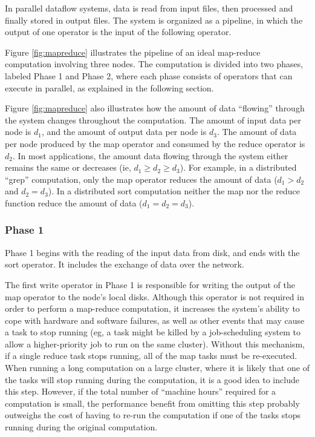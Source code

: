 \documentclass[ 11pt, letterpaper]{article}%
\begin{document}
In parallel dataflow systems, data is read from input files, then processed and
finally stored in output files. The system is organized as a pipeline, in which
the output of one operator is the input of the following operator.

\begin{figure*}
\begin{center}
\caption{A map-reduce dataflow.}
\label{fig:mapreduce}
\end{center}
\end{figure*}

Figure \ref{fig:mapreduce} illustrates the pipeline of an ideal map-reduce
computation involving three nodes. The computation is divided into two phases,
labeled Phase 1 and Phase 2, where each phase consists of operators that can
execute in parallel, as explained in the following section.

Figure \ref{fig:mapreduce} also illustrates how the amount of data ``flowing''
through the system changes throughout the computation. The amount of input data
per node is $d_1$, and the amount of output data per node is $d_3$. The amount
of data per node produced by the map operator and consumed by the reduce
operator is $d_2$. In most applications, the amount data flowing through the
system either remains the same or decreases (ie, $d_1 \ge d_2 \ge d_3$). For
example, in a distributed ``grep'' computation, only the map operator reduces
the amount of data ($d_1 > d_2$ and $d_2 =
d_3$). In a distributed sort computation neither the map nor the reduce
function reduce the amount of data ($d_1 = d_2 = d_3$).

\subsubsection{Phase 1}

Phase 1 begins with the reading of the input data from disk, and ends with the
sort operator. It includes the exchange of data over the network.

The first
write operator in Phase 1 is responsible for writing the output of the map
operator to the node's local disks. Although this operator is not required
in order to perform a map-reduce computation, it increases the system's ability to cope with hardware and software failures, as well as other events that may cause a task to stop running (eg, a task might be killed by a
job-scheduling system to allow a higher-priority job to run on the same
cluster). Without this mechanism, if a single reduce task stops running, all of the map tasks must be re-executed. When running a long computation on a large cluster, where it is
likely that one of the tasks will stop running during the computation, it is a
good idea to include this step. However, if the total number of ``machine
hours'' required for a computation is small, the performance benefit from
omitting this step probably outweighs the cost of having to re-run the
computation if one of the tasks stops running during the original
computation.
\end{document}
